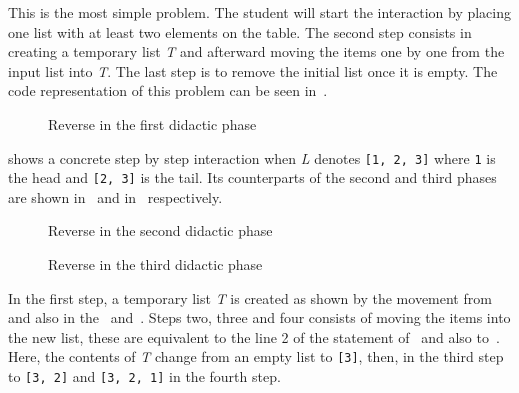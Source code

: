This is the most simple problem. The student will start the
interaction by placing one list with at least two elements on the
table. The second step consists in creating a temporary list \emph{T}
and afterward moving the items one by one from the input list into
\emph{T}. The last step is to remove the initial list once it is
empty. The \erlang code representation of this problem can be seen
in~.

\begin{figure}[h!]
  \centering
  \caption{Reverse in the first didactic phase}
\end{figure}

\FloatBarrier

 shows a concrete step by step interaction when
\emph{L} denotes \texttt{[1, 2, 3]} where \texttt{1} is the head and
\texttt{[2, 3]} is the tail. Its counterparts of the second and third
phases are shown in~ and in~
respectively.

\begin{figure}[h!]
  \centering
  \caption{Reverse in the second didactic phase}
\end{figure}

\FloatBarrier

\begin{figure}[h!]
  \centering
  \caption{Reverse in the third didactic phase}
\end{figure}

In the first step, a temporary list \emph{T} is created as shown by
the movement from~ and also in
the~
and~. Steps two, three and four
consists of moving the items into the new list, these are equivalent
to the line 2 of the \erlang statement of~ and also
to~. Here, the contents of \emph{T}
change from an empty list to \texttt{[3]}, then, in the third step to
\texttt{[3, 2]} and \texttt{[3, 2, 1]} in the fourth step.

